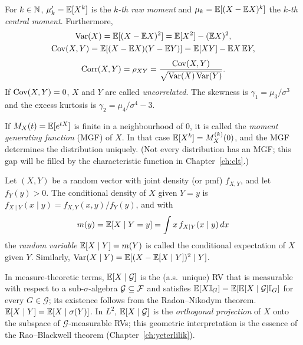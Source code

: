 \documentclass[main.tex]{subfiles}
\begin{document}
\begin{definition}
For $k\in\mathbb{N}$, $\mu_k'=\mathbb{E}[X^k]$ is the \emph{$k$-th raw moment} and $\mu_k=\mathbb{E}[(X-\mathbb{E} X)^k]$ the \emph{$k$-th central moment}. Furthermore,
\begin{gather*}
\operatorname{Var}(X) = \mathbb{E}[(X - \mathbb{E} X)^2] = \mathbb{E}[X^2] - (\mathbb{E} X)^2,\\
\operatorname{Cov}(X,Y)=\mathbb{E}[(X-\mathbb{E} X)(Y-\mathbb{E} Y)]=\mathbb{E}[XY]-\mathbb{E} X\,\mathbb{E} Y,
\end{gather*}
\[
\operatorname{Corr}(X,Y)=\rho_{XY}=\frac{\operatorname{Cov}(X,Y)}{\sqrt{\operatorname{Var}(X)\operatorname{Var}(Y)}} .
\]
If $\operatorname{Cov}(X,Y)=0$, $X$ and $Y$ are called \emph{uncorrelated}. The skewness is $\gamma_1=\mu_3/\sigma^3$ and the excess kurtosis is $\gamma_2=\mu_4/\sigma^4-3$.
\end{definition}

\begin{definition}
If $M_X(t)=\mathbb{E}[e^{tX}]$ is finite in a neighbourhood of $0$, it is called the \emph{moment generating function} (MGF) of $X$. In that case $\mathbb{E}[X^k]=M_X^{(k)}(0)$, and the MGF determines the distribution uniquely. (Not every distribution has an MGF; this gap will be filled by the characteristic function in Chapter~\ref{ch:clt}.)
\end{definition}

\begin{definition}\label{def:kosullu-beklenen}
Let $(X,Y)$ be a random vector with joint density (or pmf) $f_{X,Y}$, and let $f_Y(y)>0$. The conditional density of $X$ given $Y=y$ is $f_{X\mid Y}(x\mid y)=f_{X,Y}(x,y)/f_Y(y)$, and with
\[
m(y)=\mathbb{E}[X\mid Y=y]=\int x\,f_{X\mid Y}(x\mid y)\,dx
\]
the \emph{random variable} $\mathbb{E}[X\mid Y]=m(Y)$ is called the conditional expectation of $X$ given $Y$. Similarly, $\operatorname{Var}(X\mid Y)=\mathbb{E}[(X-\mathbb{E}[X\mid Y])^2\mid Y]$.
\end{definition}

\begin{remark}
In measure-theoretic terms, $\mathbb{E}[X\mid\mathcal{G}]$ is the (a.s.\ unique) RV that is measurable with respect to a sub-$\sigma$-algebra $\mathcal{G}\subseteq\mathcal{F}$ and satisfies $\mathbb{E}[X\mathbb{I}_G]=\mathbb{E}[\mathbb{E}[X\mid\mathcal G]\mathbb{I}_G]$ for every $G\in\mathcal{G}$; its existence follows from the Radon--Nikodym theorem. $\mathbb{E}[X\mid Y]=\mathbb{E}[X\mid\sigma(Y)]$. In $L^2$, $\mathbb{E}[X\mid\mathcal G]$ is the \emph{orthogonal projection} of $X$ onto the subspace of $\mathcal G$-measurable RVs; this geometric interpretation is the essence of the Rao--Blackwell theorem (Chapter~\ref{ch:yeterlilik}).
\end{remark}
\end{document}
